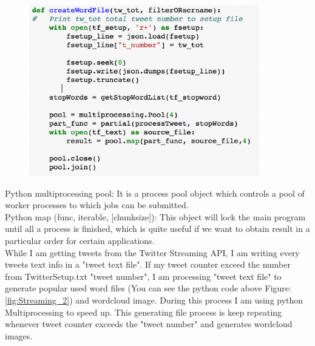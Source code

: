 \documentclass[12pt,notitlepage]{article}
\begin{document}
\begin{figure}
	\vspace{-20pt}
	\centering
	\includegraphics[width=1\linewidth]{PyMultiprocessing_1.pdf}
	\caption{}
	\label{fig:PyMultiprocessing_1}
\end{figure}



Python multiprocessing pool: It is a process pool object which controls a pool of worker processes to which jobs can be submitted. \\
Python map (func, iterable, [chunksize]): This object will lock the main program until all a process is finished, which is quite useful if we want to obtain result in a particular order for certain applications. \\


While I am getting tweets from the Twitter Streaming API, I am writing every tweets text info in a "tweet text file". If my tweet counter exceed the number from TwitterSetup.txt "tweet number", I am processing "tweet text file" to generate popular used word files (You can see the python code above  Figure:\ref{fig:Streaming_2}) and wordcloud image. During this process I am using python Multiprocessing to speed up.  This generating file process is keep repeating whenever tweet counter exceeds the "tweet number" and generates wordcloud images.\\
\end{document}
